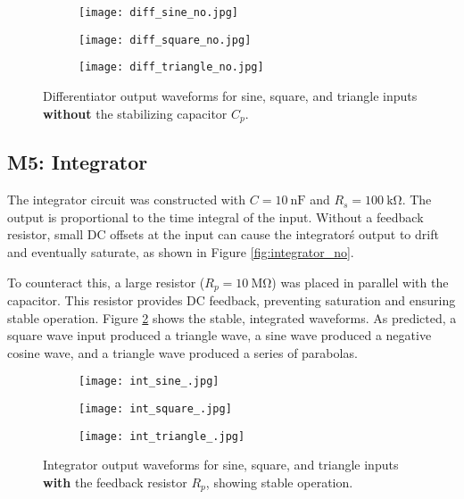 \documentclass[12pt,a4paper]{article}
\begin{document}
\begin{figure}[H]
    \centering
    \begin{subfigure}[b]{0.32\linewidth}
        \texttt{[image: diff\_sine\_no.jpg]} %
    \end{subfigure}
    \begin{subfigure}[b]{0.32\linewidth}
        \texttt{[image: diff\_square\_no.jpg]} %
    \end{subfigure}
    \begin{subfigure}[b]{0.32\linewidth}
        \texttt{[image: diff\_triangle\_no.jpg]} %
    \end{subfigure}
    \caption{Differentiator output waveforms for sine, square, and triangle inputs \textbf{without} the stabilizing capacitor \(C_p\).}
    \label{fig:differentiator_no}
\end{figure}


\subsection{M5: Integrator}
The integrator circuit was constructed with \(C = \SI{10}{\nano\farad}\) and \(R_s = \SI{100}{\kilo\ohm}\). The output is proportional to the time integral of the input. Without a feedback resistor, small DC offsets at the input can cause the integrator\'s output to drift and eventually saturate, as shown in Figure \ref{fig:integrator_no}.

To counteract this, a large resistor (\(R_p = \SI{10}{\mega\ohm}\)) was placed in parallel with the capacitor. This resistor provides DC feedback, preventing saturation and ensuring stable operation. Figure \ref{fig:integrator_} shows the stable, integrated waveforms. As predicted, a square wave input produced a triangle wave, a sine wave produced a negative cosine wave, and a triangle wave produced a series of parabolas.

\begin{figure}[H]
    \centering
    \begin{subfigure}[b]{0.32\linewidth}
        \texttt{[image: int\_sine\_.jpg]} %
    \end{subfigure}
    \begin{subfigure}[b]{0.32\linewidth}
        \texttt{[image: int\_square\_.jpg]} %
    \end{subfigure}
    \begin{subfigure}[b]{0.32\linewidth}
        \texttt{[image: int\_triangle\_.jpg]} %
    \end{subfigure}
    \caption{Integrator output waveforms for sine, square, and triangle inputs \textbf{with} the feedback resistor \(R_p\), showing stable operation.}
    \label{fig:integrator_}
\end{figure}
\end{document}
